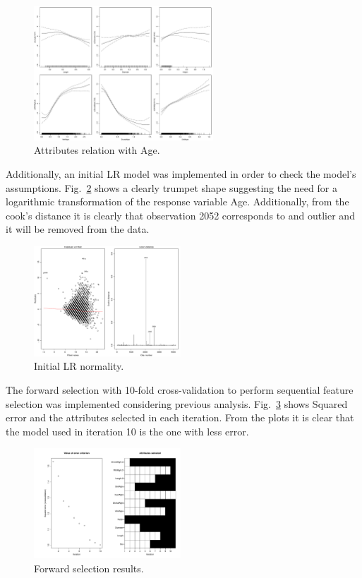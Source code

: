 \documentclass[10pt, paper=a4]{article}
\begin{document}
\begin{figure}[h]
  \centering
  \includegraphics[width = 0.60\textwidth]{gam.pdf}
  \caption{Attributes relation with Age.}
  \label{fig:gam}
\end{figure}

Additionally, an initial LR model was implemented in order to check
the model's assumptions. Fig.~\ref{fig:modelcheck} shows a clearly
trumpet shape suggesting the need for a logarithmic transformation of
the response variable Age. Additionally, from the cook's distance it
is clearly that observation 2052 corresponds to and outlier and it
will be removed from the data.

\newpage
\begin{figure}[h]
  \centering
  \includegraphics[width = 0.49\textwidth]{modelcheck.pdf}
  \caption{Initial LR normality.}
  \label{fig:modelcheck}
\end{figure}

The forward selection with 10-fold cross-validation to perform
sequential feature selection was implemented considering previous
analysis. Fig.~\ref{fig:forwardselection} shows Squared error and the
attributes selected in each iteration. From the plots it is clear that
the model used in iteration 10 is the one with less error.

\begin{figure}[h]
  \centering
  \includegraphics[width = 0.49\textwidth]{forwardselection.pdf}
  \caption{Forward selection results.}
  \label{fig:forwardselection}
\end{figure}
\end{document}
